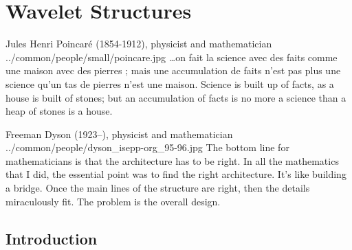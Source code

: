 ﻿%


\chapter{Wavelet Structures}

\qboxnpqt
  { Jules Henri Poincar\'e (1854-1912), physicist and mathematician
    \footnotemark
  }
  {../common/people/small/poincare.jpg}
  {\ldots on fait la science avec des faits comme une maison avec des pierres ; 
   mais une accumulation de faits n'est pas plus une science qu'un tas de 
   pierres n'est une maison.}
  {Science is built up of facts, as a house is built of stones;
   but an accumulation of facts is no more a science than a heap of stones is a house.}

\qboxnps
  {
    Freeman Dyson (1923--), physicist and mathematician  %
    \footnotemark
  }
  {../common/people/dyson_isepp-org_95-96.jpg}  %
  {The bottom line for mathematicians is that the architecture has to be right.
    In all the mathematics that I did, the essential point was to find
    the right architecture.
    It's like building a bridge.
    Once the main lines of the structure are right,
    then the details miraculously fit.
    The problem is the overall design.}

\section{Introduction}
